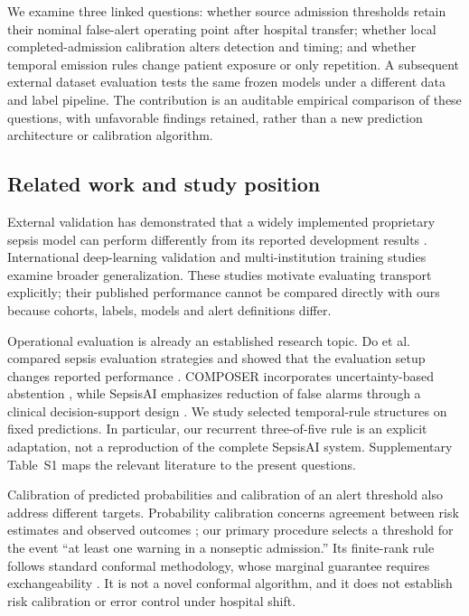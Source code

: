 \documentclass[preprint,12pt]{elsarticle}
\begin{document}
We examine three linked questions: whether source admission thresholds retain their nominal false-alert operating point after hospital transfer; whether local completed-admission calibration alters detection and timing; and whether temporal emission rules change patient exposure or only repetition. A subsequent external dataset evaluation tests the same frozen models under a different data and label pipeline. The contribution is an auditable empirical comparison of these questions, with unfavorable findings retained, rather than a new prediction architecture or calibration algorithm.

\subsection{Related work and study position}
External validation has demonstrated that a widely implemented proprietary sepsis model can perform differently from its reported development results \cite{wong}. International deep-learning validation \cite{moor} and multi-institution training studies \cite{rockenschaub} examine broader generalization. These studies motivate evaluating transport explicitly; their published performance cannot be compared directly with ours because cohorts, labels, models and alert definitions differ.

Operational evaluation is already an established research topic. Do et al. compared sepsis evaluation strategies and showed that the evaluation setup changes reported performance \cite{do}. COMPOSER incorporates uncertainty-based abstention \cite{composer}, while SepsisAI emphasizes reduction of false alarms through a clinical decision-support design \cite{gupta}. We study selected temporal-rule structures on fixed predictions. In particular, our recurrent three-of-five rule is an explicit adaptation, not a reproduction of the complete SepsisAI system. Supplementary Table~S1 maps the relevant literature to the present questions.

Calibration of predicted probabilities and calibration of an alert threshold also address different targets. Probability calibration concerns agreement between risk estimates and observed outcomes \cite{vancalster}; our primary procedure selects a threshold for the event ``at least one warning in a nonseptic admission.'' Its finite-rank rule follows standard conformal methodology, whose marginal guarantee requires exchangeability \cite{angelopoulos}. It is not a novel conformal algorithm, and it does not establish risk calibration or error control under hospital shift.
\end{document}

